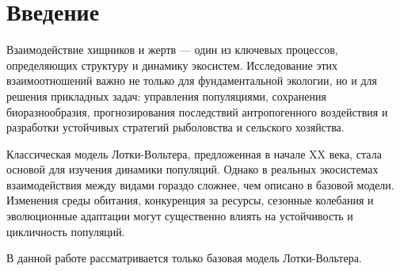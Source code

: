 \section{Введение}
Взаимодействие хищников и жертв — один из ключевых процессов, определяющих структуру и динамику экосистем. Исследование этих взаимоотношений важно не только для фундаментальной экологии, но и для решения прикладных задач: управления популяциями, сохранения биоразнообразия, прогнозирования последствий антропогенного воздействия и разработки устойчивых стратегий рыболовства и сельского хозяйства.

Классическая модель Лотки-Вольтера, предложенная в начале XX века, стала основой для изучения динамики популяций.
Однако в реальных экосистемах взаимодействия между видами гораздо сложнее, чем описано в базовой модели. Изменения среды обитания, конкуренция за ресурсы, сезонные колебания и эволюционные адаптации могут существенно влиять на устойчивость и цикличность популяций. 

В данной работе рассматривается только базовая модель Лотки-Вольтера.
